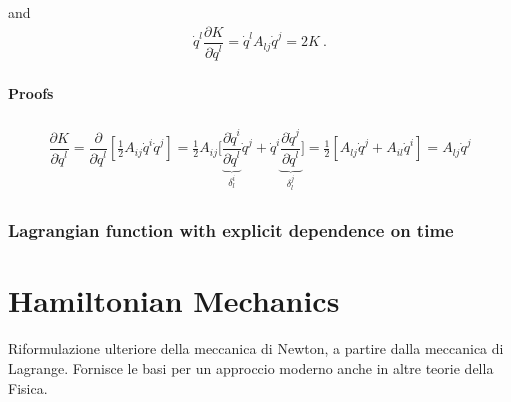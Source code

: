 \documentclass[letterpaper,10pt,english]{jupyterBook}
\begin{document}
\sphinxAtStartPar
and
\begin{equation}\label{equation:ch/lagrange-t-no:eq:lagrange:time:ind:dqdK_dq}
\begin{split}\dot{q}^l \dfrac{\partial K}{\partial \dot{q}^l} = \dot{q}^l A_{lj} \dot{q}^j = 2 K \ .\end{split}
\end{equation}\subsubsection*{Proofs}
\begin{equation*}
\begin{split}\begin{aligned}
  \dfrac{\partial K}{\partial \dot{q}^l} 
    = \dfrac{\partial }{\partial \dot{q}^l} \left[ \frac{1}{2} A_{ij} \dot{q}^i \dot{q}^j \right] 
    = \frac{1}{2} A_{ij} \bigg[ \underbrace{ \dfrac{\partial \dot{q}^i}{\partial \dot{q}^l} }_{\delta^i_l} \dot{q}^j + \dot{q}^i \underbrace{ \dfrac{\partial \dot{q}^j}{\partial \dot{q}^l}}_{\delta^j_l} \bigg]  
    = \frac{1}{2} \left[ A_{lj} \dot{q}^j + A_{il} \dot{q}^i \right]
    = A_{lj} \dot{q}^j
\end{aligned}\end{split}
\end{equation*}
\sphinxstepscope


\subsection{Lagrangian function with explicit dependence on time}
\label{\detokenize{ch/lagrange-t-explicit:lagrangian-function-with-explicit-dependence-on-time}}\label{\detokenize{ch/lagrange-t-explicit:classical-mechanics-lagrange-time-dependent}}\label{\detokenize{ch/lagrange-t-explicit::doc}}
\sphinxstepscope




\chapter{Hamiltonian Mechanics}
\label{\detokenize{ch/hamilton:hamiltonian-mechanics}}\label{\detokenize{ch/hamilton:classical-mechanics-hamilton}}\label{\detokenize{ch/hamilton::doc}}
\sphinxAtStartPar
Riformulazione ulteriore della meccanica di Newton, a partire dalla meccanica di Lagrange.
Fornisce le basi per un approccio moderno anche in altre teorie della Fisica. 
\end{document}
